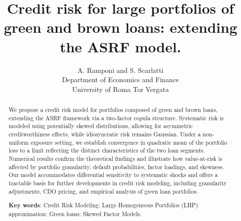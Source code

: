 \documentclass[preprint,12pt]{article}
\begin{document}


\title{Credit risk for large portfolios of green and brown loans:  extending the ASRF model.}


\author{A. Ramponi and S. Scarlatti \\ Department of Economics and Finance \\ University of Roma Tor Vergata}

\maketitle


\begin{abstract}
We propose a credit risk model for portfolios composed of green and brown loans, extending the ASRF framework via a two-factor copula structure. Systematic risk is modeled using potentially skewed distributions, allowing for asymmetric creditworthiness effects, while idiosyncratic risk remains Gaussian. Under a non-uniform exposure setting, we establish convergence in quadratic mean of the portfolio loss to a limit reflecting the distinct characteristics of the two loan segments. Numerical results confirm the theoretical findings and illustrate how value-at-risk is affected by portfolio granularity, default probabilities, factor loadings, and skewness. Our model accommodates differential sensitivity to systematic shocks and offers a tractable basis for further developments in credit risk modeling, including granularity adjustments, CDO pricing, and empirical analysis of green loan portfolios. 
\bigskip

\noindent \textbf{Key words}: Credit Risk Modeling; Large Homogeneous Portfolios (LHP) approximation; Green loans; Skewed Factor Models.

\end{abstract}



\end{document}
